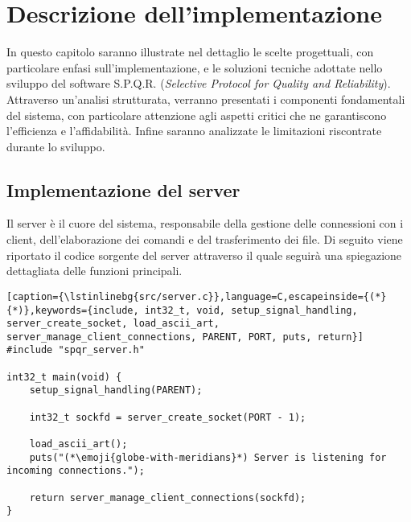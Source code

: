 \chapter{Descrizione dell'implementazione}

In questo capitolo saranno illustrate nel dettaglio le scelte progettuali, con particolare enfasi sull'implementazione, e le soluzioni tecniche adottate nello sviluppo del software S.P.Q.R. (\textit{Selective Protocol for Quality and Reliability}).
Attraverso un'analisi strutturata, verranno presentati i componenti fondamentali del sistema, con particolare attenzione agli aspetti critici che ne garantiscono l'efficienza e l'affidabilità.
Infine saranno analizzate le limitazioni riscontrate durante lo sviluppo.



\section{Implementazione del server}
Il server è il cuore del sistema, responsabile della gestione delle connessioni con i client, dell'elaborazione dei comandi e del trasferimento dei file.
Di seguito viene riportato il codice sorgente del server attraverso il quale seguirà una spiegazione dettagliata delle funzioni principali.

\begin{lstlisting}[caption={\lstinlinebg{src/server.c}},language=C,escapeinside={(*}{*)},keywords={include, int32_t, void, setup_signal_handling, server_create_socket, load_ascii_art, server_manage_client_connections, PARENT, PORT, puts, return}]
#include "spqr_server.h"

int32_t main(void) {
    setup_signal_handling(PARENT);
    
    int32_t sockfd = server_create_socket(PORT - 1);
    
    load_ascii_art();
    puts("(*\emoji{globe-with-meridians}*) Server is listening for incoming connections.");
    
    return server_manage_client_connections(sockfd);
}
\end{lstlisting}

